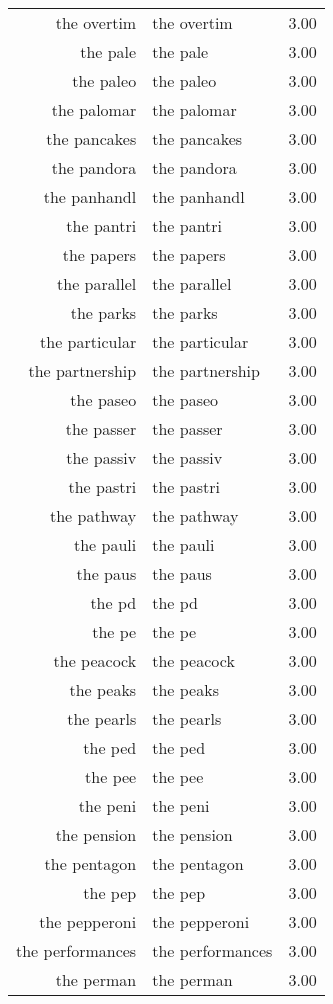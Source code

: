 \begin{table}[ht]
\begin{tabular}{rlr}
  the overtim & the overtim & 3.00 \\ 
  the pale & the pale & 3.00 \\ 
  the paleo & the paleo & 3.00 \\ 
  the palomar & the palomar & 3.00 \\ 
  the pancakes & the pancakes & 3.00 \\ 
  the pandora & the pandora & 3.00 \\ 
  the panhandl & the panhandl & 3.00 \\ 
  the pantri & the pantri & 3.00 \\ 
  the papers & the papers & 3.00 \\ 
  the parallel & the parallel & 3.00 \\ 
  the parks & the parks & 3.00 \\ 
  the particular & the particular & 3.00 \\ 
  the partnership & the partnership & 3.00 \\ 
  the paseo & the paseo & 3.00 \\ 
  the passer & the passer & 3.00 \\ 
  the passiv & the passiv & 3.00 \\ 
  the pastri & the pastri & 3.00 \\ 
  the pathway & the pathway & 3.00 \\ 
  the pauli & the pauli & 3.00 \\ 
  the paus & the paus & 3.00 \\ 
  the pd & the pd & 3.00 \\ 
  the pe & the pe & 3.00 \\ 
  the peacock & the peacock & 3.00 \\ 
  the peaks & the peaks & 3.00 \\ 
  the pearls & the pearls & 3.00 \\ 
  the ped & the ped & 3.00 \\ 
  the pee & the pee & 3.00 \\ 
  the peni & the peni & 3.00 \\ 
  the pension & the pension & 3.00 \\ 
  the pentagon & the pentagon & 3.00 \\ 
  the pep & the pep & 3.00 \\ 
  the pepperoni & the pepperoni & 3.00 \\ 
  the performances & the performances & 3.00 \\ 
  the perman & the perman & 3.00 \\ 

\end{tabular}
\end{table}
